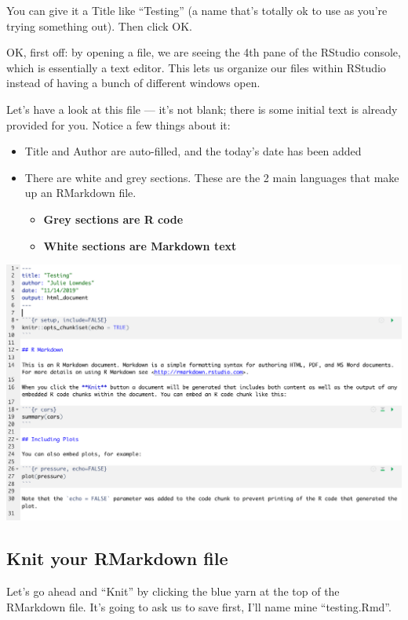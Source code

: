 \documentclass[]{book}
\providecommand{\tightlist}{%
  \setlength{\itemsep}{0pt}\setlength{\parskip}{0pt}}
\begin{document}
You can give it a Title like ``Testing'' (a name that's totally ok to use as you're trying something out). Then click OK.

OK, first off: by opening a file, we are seeing the 4th pane of the RStudio console, which is essentially a text editor. This lets us organize our files within RStudio instead of having a bunch of different windows open.

Let's have a look at this file --- it's not blank; there is some initial text is already provided for you. Notice a few things about it:

\begin{itemize}
\tightlist
\item
  Title and Author are auto-filled, and the today's date has been added
\item
  There are white and grey sections. These are the 2 main languages that make up an RMarkdown file.

  \begin{itemize}
  \tightlist
  \item
    \textbf{Grey sections are R code}
  \item
    \textbf{White sections are Markdown text}
  \end{itemize}
\end{itemize}

\includegraphics[width=0.8\linewidth]{img/rmarkdown}

\hypertarget{knit-your-rmarkdown-file}{%
\subsection{Knit your RMarkdown file}\label{knit-your-rmarkdown-file}}

Let's go ahead and ``Knit'' by clicking the blue yarn at the top of the RMarkdown file. It's going to ask us to save first, I'll name mine ``testing.Rmd''.
\end{document}
